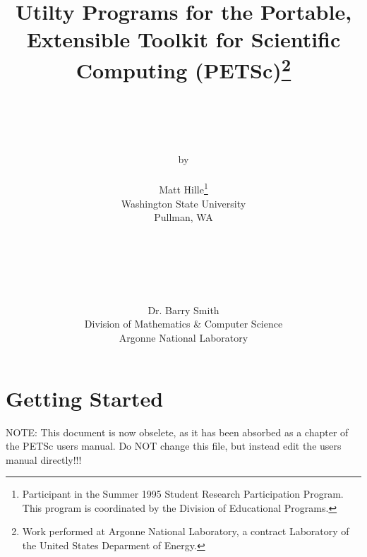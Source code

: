 

\def\note{\medskip \noindent Note:\begin{em}}
\def\endnote{\end{em} \medskip}






\begin{titlepage}

\title{Utilty Programs for the Portable, Extensible Toolkit for Scientific
	Computing (PETSc)\thanks{Work performed at Argonne National
	Laboratory, a contract Laboratory of the United States Deparment of
	Energy.}}

\author{\\ \\ \\ \\ by \\ \\ Matt Hille\thanks{Participant in the Summer 1995 Student
   Research Participation Program.  This program is coordinated by the 
   Division of Educational Programs.} \\ Washington State University \\ 
   Pullman, WA \\ \\ \\
\and
   \\ \\ \\ Dr. Barry Smith \\ Division of Mathematics \& Computer Science \\
   Argonne National Laboratory}

\end{titlepage}
\maketitle

\newpage 

\tableofcontents

\newpage
\section{Getting Started}

NOTE: This document is now obselete, as it has been absorbed as a
chapter of the PETSc users manual.  Do NOT change this file, but 
instead edit the users manual directly!!!

